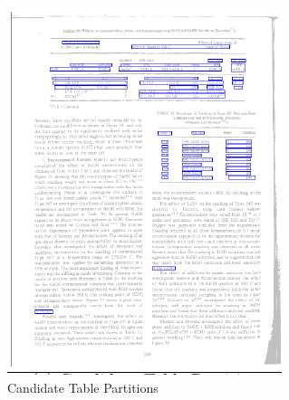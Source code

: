 \begin{figure}[H]
\begin{subfigure}{0.31\textwidth}
\includegraphics[width=\linewidth]{img/tableDetectionCandidate.pdf}
\caption{Candidate Table Partitions} \label{fig:1c}
\end{subfigure}
\begin{subfigure}{0.31\textwidth}

\end{subfigure}
\end{figure}
